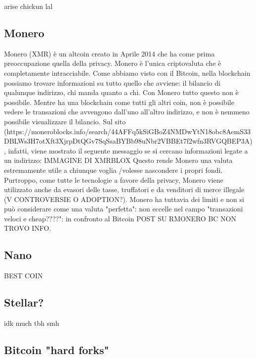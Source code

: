 \documentclass {article}
\begin{document}
arise chickun lal



\subsection {Monero}



Monero (XMR) è un altcoin creato in Aprile 2014 che ha come prima preoccupazione quella della privacy.
Monero è l'unica criptovaluta che è completamente intracciabile. Come abbiamo visto con il Bitcoin, nella blockchain possiamo trovare informazioni su tutto quello che avviene: il bilancio di qualunque indirizzo, chi manda quanto a chi.
Con Monero tutto questo non è possibile. Mentre ha una blockchain come tutti gli altri coin, non è possibile vedere le transazioni che avvengono dall'uno all'altro indirizzo, e non è nemmeno possibile visualizzare il bilancio.
Sul sito (https://moneroblocks.info/search/44AFFq5kSiGBoZ4NMDwYtN18obc8AemS33DBLWs3H7otXft3XjrpDtQGv7SqSsaBYBb98uNbr2VBBEt7f2wfn3RVGQBEP3A), infatti, viene mostrato il seguente messaggio se si cercano informazioni legate a un indirizzo:
IMMAGINE DI XMRBLOX
Questo rende Monero una valuta estremamente utile a chiunque voglia /volesse nascondere i propri fondi. Purtroppo, come tutte le tecnologie a favore della privacy, Monero viene utilizzato anche da evasori delle tasse, truffatori e da venditori di merce illegale (V CONTROVERSIE O ADOPTION?).
Monero ha tuttavia dei limiti e non si può considerare come una valuta "perfetta": non eccelle nel campo "transazioni veloci e cheap????": in confronto al Bitcoin POST SU RMONERO BC NON TROVO INFO.



\subsection {Nano}



BEST COIN



\subsection {Stellar?}



idk much tbh smh



\subsection {Bitcoin "hard forks"}
\end{document}
